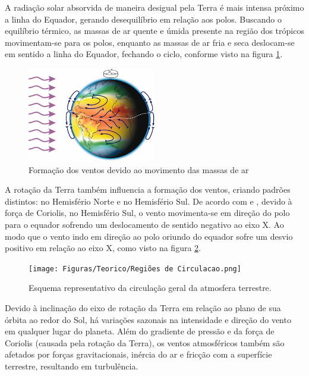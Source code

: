  \par A radiação solar absorvida de maneira desigual pela Terra é mais intensa próximo a linha do Equador, gerando desequilíbrio em relação aos polos. Buscando o equilíbrio térmico, as massas de ar quente e úmida presente na região dos trópicos movimentam-se para os polos, enquanto as massas de ar fria e seca deslocam-se em sentido a linha do Equador, fechando o ciclo, conforme visto na figura \ref{fig:FormacaoDosVentos}.

\begin{figure}[H]
    \caption{Formação dos ventos devido ao movimento das massas de ar}
    \label{fig:FormacaoDosVentos}
    \centering
    \includegraphics[width=0.5\textwidth]{Figuras/Teorico/FormacaoDosVentos.png}
\end{figure}

\par A rotação da Terra também influencia a formação dos ventos, criando padrões distintos: no Hemisfério Norte e no Hemisfério Sul. De acordo com  e , devido à força de Coriolis, no Hemisfério Sul, o vento movimenta-se em direção do polo para o equador sofrendo um deslocamento de sentido negativo ao eixo X. Ao modo que o vento indo em direção ao polo oriundo do equador sofre um desvio positivo em relação ao eixo X, como visto na figura \ref{fig:circulação geral da atmosfera terrestre}. 

\begin{figure}[H]
    \caption{Esquema representativo da circulação geral da atmosfera terrestre.}
    \label{fig:circulação geral da atmosfera terrestre}
    \centering
    \texttt{[image: Figuras/Teorico/Regiões de Circulacao.png]}
\end{figure}

\par Devido à inclinação do eixo de rotação da Terra em relação ao plano de sua órbita ao redor do Sol, há variações sazonais na intensidade e direção do vento em qualquer lugar do planeta. Além do gradiente de pressão e da força de Coriolis (causada pela rotação da Terra), os ventos atmosféricos também são afetados por forças gravitacionais, inércia do ar e fricção com a superfície terrestre, resultando em turbulência.

